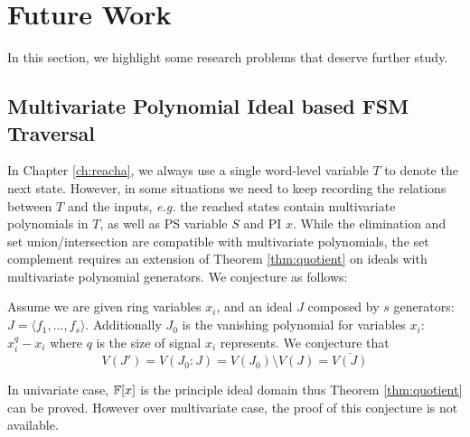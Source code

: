 \section{Future Work}
In this section, we highlight some research problems that deserve further study.
\subsection{Multivariate Polynomial Ideal based FSM Traversal}
In Chapter \ref{ch:reacha}, we always use a single word-level variable $T$ to denote the
next state. However, in some situations we need to keep recording the relations between $T$ and
the inputs, {\it e.g.} the reached states contain multivariate polynomials in $T$, as well as 
PS variable $S$ and PI $x$. 
While the elimination and set union/intersection are compatible with multivariate polynomials,
the set complement requires an extension of Theorem \ref{thm:quotient} on ideals with 
multivariate polynomial generators. We conjecture as follows:

\begin{Conjecture}
Assume we are given ring variables $x_i$, and an ideal $J$ composed by $s$ generators:
$J = \langle f_1,\dots, f_s\rangle$.  Additionally $J_0$ is the vanishing polynomial for variables
$x_i$: $ x_i^{q} - x_i$ where $q$ is the size of signal $x_i$ represents.
We conjecture that
$$V(J') = V(J_0:J) = V(J_0)\setminus V(J) = \overline{V(J)}$$
\end{Conjecture}

In univariate case, ${\mathbb{F}}[x]$ is the principle ideal domain thus Theorem \ref{thm:quotient} can be proved.
However over multivariate case, the proof of this conjecture is not available.


